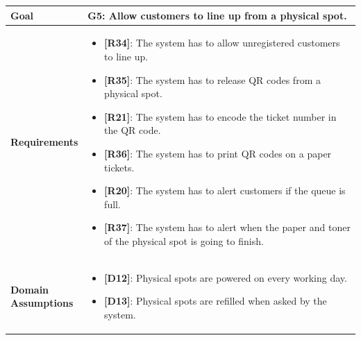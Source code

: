 \begin{table}[H]
\centering
\begin{tabular}{| m{} | m{} |} 
	\hline
	\textbf{Goal} &
		\textbf{G5: Allow customers to line up from a physical spot.} \\
	\hline
	\textbf{Requirements} &
		\begin{itemize}
			\item {\textbf{[R34]}}: The system has to allow unregistered customers to line up.
			\item {\textbf{[R35]}}: The system has to release QR codes from a physical spot.
			\item {\textbf{[R21]}}: The system has to encode the ticket number in the QR code.
			\item {\textbf{[R36]}}: The system has to print QR codes on a paper tickets.
			\item {\textbf{[R20]}}: The system has to alert customers if the queue is full.
			\item {\textbf{[R37]}}: The system has to alert when the paper and toner of the physical spot is going to finish.
		\end{itemize} \\ 
	\hline
	\shortstack[l]{\textbf{Domain} \\ \textbf{Assumptions}} & 
		\begin{itemize}
			\item {\textbf{[D12]}}: Physical spots are powered on every working day.
			\item {\textbf{[D13]}}: Physical spots are refilled when asked by the system. 
		\end{itemize} \\ 
	\hline
\end{tabular}
\end{table}

